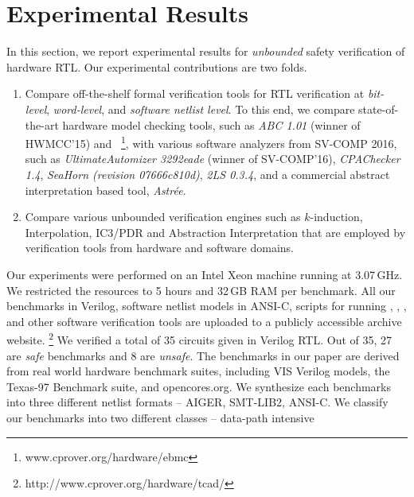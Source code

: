 \section{Experimental Results}
In this section, we report experimental results for \emph{unbounded} safety 
verification of hardware RTL.  Our experimental contributions are two folds.
%
\begin{enumerate}
  \item Compare off-the-shelf formal verification tools for RTL verification at 
    \emph{bit-level}, \emph{word-level}, and \emph{software netlist level}.  
    To this end, we compare state-of-the-art hardware model checking tools, such as 
    \emph{ABC 1.01} (winner of HWMCC'15) and 
    \ebmcv~\footnote{\scriptsize{www.cprover.org/hardware/ebmc}}, 
    with various software analyzers from SV-COMP 2016, such as 
    \emph{UltimateAutomizer 3292eade} (winner of SV-COMP'16), 
    \emph{CPAChecker 1.4}, 
    \emph{SeaHorn (revision 07666c810d)}, \emph{2LS 0.3.4}, 
    and a commercial abstract 
    interpretation based tool, \emph{Astr{\'e}e}.  
  
 \item  Compare various unbounded verification engines such as $k$-induction, 
    Interpolation, IC3/PDR and Abstraction Interpretation that are employed by 
    verification tools from hardware and software domains.
\end{enumerate}
%
Our experiments were performed on an Intel Xeon machine running at
3.07\,GHz.  We restricted the resources to 5 hours and 32\,GB RAM per
benchmark.  All our benchmarks in Verilog, software netlist models in 
ANSI-C, scripts for running \yosys, \ABC, \ebmcv, and other software 
verification tools are uploaded to a publicly accessible archive website.
\footnote{\scriptsize{http://www.cprover.org/hardware/tcad/}}
%
%
We verified a total of 35 circuits given in Verilog RTL.  Out of 35, 27 
are \emph{safe} benchmarks and 8 are \emph{unsafe}.  The benchmarks in 
our paper are derived from real world hardware benchmark suites, including 
VIS Verilog models, the Texas-97 Benchmark suite, and opencores.org. We synthesize 
each benchmarks into three different netlist formats -- AIGER, SMT-LIB2, ANSI-C.
We classify our benchmarks into two different classes -- data-path intensive
